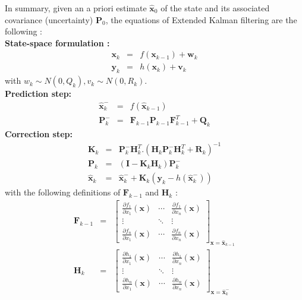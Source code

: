 \documentclass[10pt,oneside]{scrartcl}
\newcommand\vecteur[1]{\boldsymbol#1}
\newcommand\matrice[1]{\mathbf#1}
\begin{document}
In summary, given an a priori estimate $\hat{\vecteur{x}}_0$ of the
state and its associated covariance (uncertainty) $\matrice{P}_0$, the
equations of Extended Kalman filtering are the following :\\
\textbf{State-space formulation :}\\
\begin{eqnarray}
\vecteur{x_k} &=& f(\vecteur{x}_{k-1}) + \vecteur{w}_{k}\\
\vecteur{y_k} &=& h(\vecteur{x_k}) + \vecteur{v_k}
\end{eqnarray}
with $w_k\sim N(0,Q_k), v_k \sim N(0,R_k)$.\\
\textbf{Prediction step:}\\
\begin{eqnarray}
\hat{\vecteur{x}}^-_k &=& f(\hat{\vecteur{x}}_{k-1})\\
\matrice{P^-_k} &=& \matrice{F}_{k-1} \matrice{P_{k-1}} \matrice{F}_{k-1}^T + \matrice{Q_k}
\end{eqnarray}
\textbf{Correction step:}\\
\begin{eqnarray}
\matrice{K_k} &=& \matrice{P^-_k} \matrice{H}_k^T . (\matrice{H}_k \matrice{P^-_k} \matrice{H}_k^T +\matrice{R_k})^{-1}\\
\matrice{P_k} &=& (\matrice{I} - \matrice{K_k} \matrice{H}_k) \matrice{P^-_k}\\
\hat{\vecteur{x}}_k &=& \hat{\vecteur{x}}^-_k + \matrice{K_k} (\vecteur{y_k} - h(\hat{\vecteur{x}}_k^-))
\end{eqnarray}
with the following definitions of $\matrice{F}_{k-1}$ and $\matrice{H}_k$ :
\begin{eqnarray}
\matrice{F}_{k-1} &=& \begin{bmatrix}
\frac{\partial f_1}{\partial x_1}(\vecteur{x}) & \cdots & \frac{\partial f_1}{\partial x_n}(\vecteur{x})\\
\vdots & \ddots & \vdots\\
\frac{\partial f_n}{\partial x_1}(\vecteur{x}) & \cdots & \frac{\partial f_n}{\partial x_n}(\vecteur{x})
\end{bmatrix}_{\vecteur{x} = \hat{\vecteur{x}}_{k-1}} \\
\matrice{H}_{k} &=& \begin{bmatrix}
\frac{\partial h_1}{\partial x_1}(\vecteur{x}) & \cdots & \frac{\partial h_1}{\partial x_n}(\vecteur{x})\\
\vdots & \ddots & \vdots\\
\frac{\partial h_n}{\partial x_1}(\vecteur{x}) & \cdots & \frac{\partial h_n}{\partial x_n}(\vecteur{x})
\end{bmatrix}_{\vecteur{x} = \hat{\vecteur{x}}_k^-}
\end{eqnarray}
\end{document}
